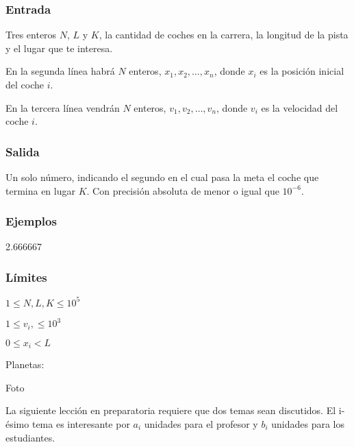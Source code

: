 \subsubsection*{Entrada}
Tres enteros \(N\), \(L\) y \(K\), la cantidad de coches en la carrera, la longitud de la pista y el lugar que te interesa.

En la segunda línea habrá \(N\) enteros, \(x_1, x_2, \ldots, x_n\), donde \(x_i\) es la posición inicial del coche \(i\).

En la tercera línea vendrán \(N\) enteros, \(v_1, v_2, \ldots, v_n\), donde \(v_i\) es la velocidad del coche \(i\).

\subsubsection*{Salida}
Un solo número, indicando el segundo en el cual pasa la meta el coche que termina en lugar \(K\). Con precisión absoluta de menor o igual que \(10^{-6}\).

\subsubsection*{Ejemplos}
\begin{casebox2}
	  {
		2.666667
	}
\end{casebox2}
\subsubsection*{Límites}
\begin{plimits}
	\item \(1\leq N, L, K \leq 10^5\)
	\item \(1\leq v_i, \leq 10^3\)
	\item \(0 \leq x_i < L\)
\end{plimits}

\problembreak

\problemtitle Planetas: 


\problembreak

\problemtitle Foto


\problembreak

\problemtitle La siguiente lección en preparatoria requiere que dos temas sean discutidos. El i-ésimo tema es interesante por \(a_i\) unidades para el profesor y \(b_i\) unidades para los estudiantes.

